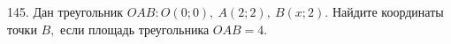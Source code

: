 145. Дан треугольник $OAB: O(0;0),\ A(2;2),\ B(x;2).$ Найдите координаты точки $B,$ если площадь треугольника $OAB=4.$\\
